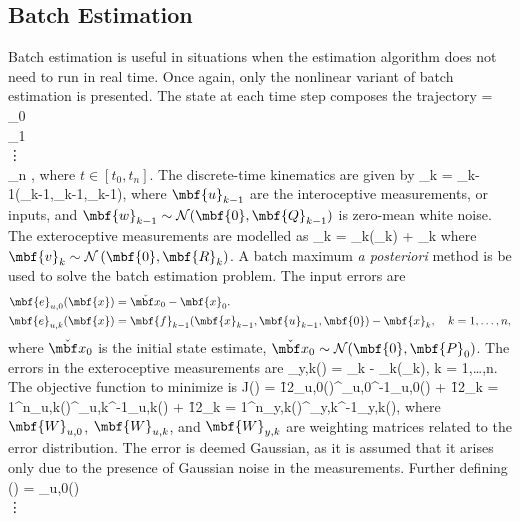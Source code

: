 \subsection{Batch Estimation \cite[pp.127-143]{Barfoot2017}}

Batch estimation is useful in situations when the estimation algorithm does not need to run in real time. Once again, only the nonlinear variant of batch estimation is presented. The state at each time step composes the trajectory
\bdis
	 = 
		_0 \\
		_1 \\
		\vdots \\
		_n
	\ema,
\edis
where $t \in [t_0,t_n]$.
The discrete-time kinematics are given by
\bdis
	_k = _{k-1}\left(_{k-1},_{k-1},_{k-1}\right),
\edis
where $\mbf{u}_{k-1}$ are the interoceptive measurements, or inputs, and $\mbf{w}_{k-1} \sim \mathcal{N}(\mbf{0},\mbf{Q}_{k-1})$ is zero-mean white noise. The exteroceptive measurements are modelled as
\bdis
	_k = _k(_k) + _k
\edis
where $\mbf{v}_{k} \sim \mathcal{N}\left(\mbf{0},\mbf{R}_{k}\right)$. A batch maximum \textit{a posteriori} method is be used to solve the batch estimation problem. The input errors are 
\begin{align*}
	\mbf{e}_{u,0}(\mbf{x}) &= \mbfch{x}_0 - \mbf{x}_0. \\
	\mbf{e}_{u,k}(\mbf{x}) &= \mbf{f}_{k-1}(\mbf{x}_{k-1},\mbf{u}_{k-1},\mbf{0}) - \mbf{x}_k, \quad k = 1,\ldots,n,
\end{align*}
where $\mbfch{x}_0$ is the initial state estimate, $\mbfch{x}_0 \sim \mc{N}(\mbf{0},\mbf{P}_0)$. The errors in the exteroceptive measurements are
\bdis
	_{y,k}() = _k - _k(_k), \quad k = 1,\ldots,n.
\edis
The objective function to minimize is
\bdis
	J() = \f{1}{2}_{u,0}()^\trans{}_{u,0}^{-1}_{u,0}() + \f{1}{2}\sum_{k = 1}^n_{u,k}()^\trans{}_{u,k}^{-1}_{u,k}() + \f{1}{2}\sum_{k = 1}^n_{y,k}()^\trans{}_{y,k}^{-1}_{y,k}(),
\edis
where $\mbf{W}_{u,0}$, $\mbf{W}_{u,k}$, and $\mbf{W}_{y,k}$ are weighting matrices related to the error distribution. The error is deemed Gaussian, as it is assumed that it arises only due to the presence of Gaussian noise in the measurements.  Further defining
\bdis
	() =
		_{u,0}() \\
		\vdots \\
